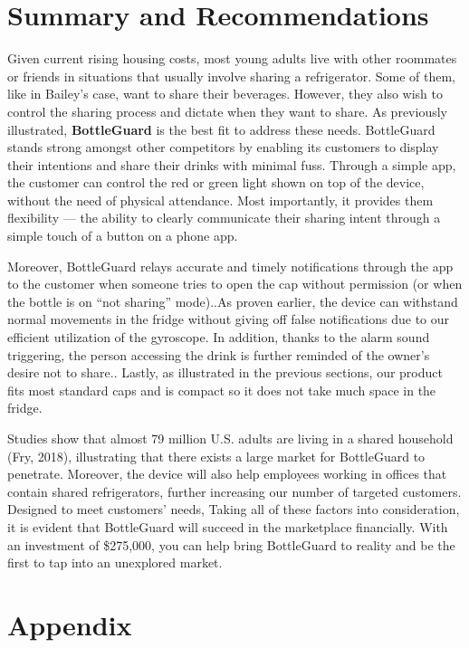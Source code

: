 \documentclass[12pt]{article}
\begin{document}
	\section*{Summary and Recommendations}
		
		Given current rising housing costs, most young adults live with other roommates or friends in situations that usually involve sharing a refrigerator. Some of them, like in Bailey’s case, want to share their beverages. However, they also wish to control the sharing process and dictate when they want to share. As previously illustrated, \textbf{BottleGuard} is the best fit to address these needs. BottleGuard stands strong amongst other competitors by enabling its customers to display their intentions and share their drinks with minimal fuss.  Through a simple app, the customer can control the red or green light shown on top of the device, without the need of physical attendance. Most importantly, it provides them flexibility — the ability to clearly communicate their sharing intent through a simple touch of a button on a phone app.
		
		Moreover, BottleGuard relays accurate and timely notifications through the app to the customer when someone tries to open the cap without permission (or when the bottle is on “not sharing” mode)..As proven earlier, the device can withstand normal movements in the fridge without giving off false notifications due to our efficient utilization of the gyroscope. In addition, thanks to the alarm sound triggering, the person accessing the drink is further reminded of the owner’s desire not to share.. Lastly, as illustrated in the previous sections, our product fits most standard caps and is compact so it does not take much space in the fridge. 
		
		Studies show that almost 79 million U.S. adults are living in a shared household (Fry, 2018), illustrating that there exists a large market for BottleGuard to penetrate. Moreover, the device will also help employees working in offices that contain shared refrigerators, further increasing our number of targeted customers. Designed to meet customers’ needs, Taking all of these factors into consideration, it is evident that BottleGuard will succeed in the marketplace financially. With an investment of \$275,000, you can help bring BottleGuard to reality and be the first to tap into an unexplored market.
		

		
		\newpage
		\section*{Appendix}
\end{document}
